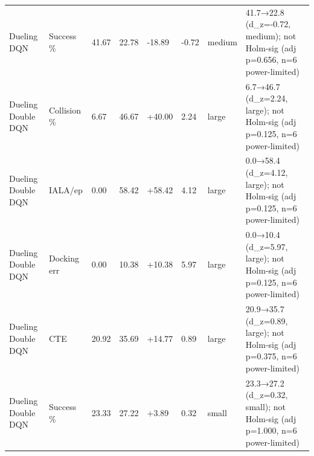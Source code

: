 \begin{tabular}{llllllll}
Dueling DQN & Success \% & 41.67 & 22.78 & -18.89 & -0.72 & medium & 41.7→22.8 (d\_z=-0.72, medium); not Holm-sig (adj p=0.656, n=6 power-limited) \\
Dueling Double DQN & Collision \% & 6.67 & 46.67 & +40.00 & 2.24 & large & 6.7→46.7 (d\_z=2.24, large); not Holm-sig (adj p=0.125, n=6 power-limited) \\
Dueling Double DQN & IALA/ep & 0.00 & 58.42 & +58.42 & 4.12 & large & 0.0→58.4 (d\_z=4.12, large); not Holm-sig (adj p=0.125, n=6 power-limited) \\
Dueling Double DQN & Docking err & 0.00 & 10.38 & +10.38 & 5.97 & large & 0.0→10.4 (d\_z=5.97, large); not Holm-sig (adj p=0.125, n=6 power-limited) \\
Dueling Double DQN & CTE & 20.92 & 35.69 & +14.77 & 0.89 & large & 20.9→35.7 (d\_z=0.89, large); not Holm-sig (adj p=0.375, n=6 power-limited) \\
Dueling Double DQN & Success \% & 23.33 & 27.22 & +3.89 & 0.32 & small & 23.3→27.2 (d\_z=0.32, small); not Holm-sig (adj p=1.000, n=6 power-limited) \\
\bottomrule
\end{tabular}
